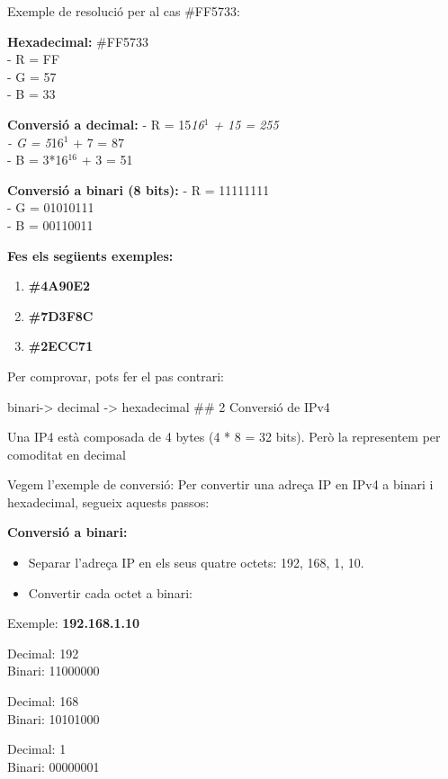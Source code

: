 \documentclass[
  12 pt,
  a4paper,
]{article}
\providecommand{\tightlist}{%
  \setlength{\itemsep}{0pt}\setlength{\parskip}{0pt}}
\begin{document}
Exemple de resolució per al cas \#FF5733:

\textbf{Hexadecimal:} \#FF5733\\
- R = FF\\
- G = 57\\
- B = 33

\textbf{Conversió a decimal:} - R = 15\emph{16\(^{1}\) + 15 = 255\\
- G = 5}16\(^{1}\) + 7 = 87\\
- B = 3*16\(^{16}\) + 3 = 51

\textbf{Conversió a binari (8 bits):} - R = 11111111\\
- G = 01010111\\
- B = 00110011

\textbf{Fes els següents exemples:}

\begin{enumerate}
\def\labelenumi{\arabic{enumi}.}
\tightlist
\item
  \textbf{\#4A90E2}\\
\item
  \textbf{\#7D3F8C}\\
\item
  \textbf{\#2ECC71}
\end{enumerate}

Per comprovar, pots fer el pas contrari:

binari-\textgreater{} decimal -\textgreater{} hexadecimal \#\# 2
Conversió de IPv4

Una IP4 està composada de 4 bytes (4 * 8 = 32 bits). Però la representem
per comoditat en decimal

Vegem l'exemple de conversió: Per convertir una adreça IP en IPv4 a
binari i hexadecimal, segueix aquests passos:

\textbf{Conversió a binari:}

\begin{itemize}
\tightlist
\item
  Separar l'adreça IP en els seus quatre octets: 192, 168, 1, 10.
\item
  Convertir cada octet a binari:
\end{itemize}

Exemple: \textbf{192.168.1.10}

Decimal: 192\\
Binari: 11000000

Decimal: 168\\
Binari: 10101000

Decimal: 1\\
Binari: 00000001
\end{document}
